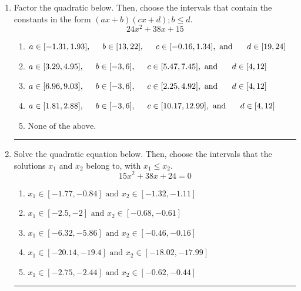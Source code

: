 \documentclass[14pt]{extbook}
\newcommand{\litem}[1]{\item#1\hspace*{-1cm}\rule{\textwidth}{0.4pt}}
\begin{document}
\begin{enumerate}
{\begin{enumerate}[label=\Alph*.]
\end{enumerate} }
\litem{
Factor the quadratic below. Then, choose the intervals that contain the constants in the form $(ax+b)(cx+d); b \leq d.$\[ 24x^{2} +38 x + 15 \]\begin{enumerate}[label=\Alph*.]
\item \( a \in [-1.31, 1.93], \hspace*{5mm} b \in [13, 22], \hspace*{5mm} c \in [-0.16, 1.34], \text{ and } \hspace*{5mm} d \in [19, 24] \)
\item \( a \in [3.29, 4.95], \hspace*{5mm} b \in [-3, 6], \hspace*{5mm} c \in [5.47, 7.45], \text{ and } \hspace*{5mm} d \in [4, 12] \)
\item \( a \in [6.96, 9.03], \hspace*{5mm} b \in [-3, 6], \hspace*{5mm} c \in [2.25, 4.92], \text{ and } \hspace*{5mm} d \in [4, 12] \)
\item \( a \in [1.81, 2.88], \hspace*{5mm} b \in [-3, 6], \hspace*{5mm} c \in [10.17, 12.99], \text{ and } \hspace*{5mm} d \in [4, 12] \)
\item \( \text{None of the above.} \)

\end{enumerate} }
\litem{
Solve the quadratic equation below. Then, choose the intervals that the solutions $x_1$ and $x_2$ belong to, with $x_1 \leq x_2$.\[ 15x^{2} +38 x + 24 = 0 \]\begin{enumerate}[label=\Alph*.]
\item \( x_1 \in [-1.77, -0.84] \text{ and } x_2 \in [-1.32, -1.11] \)
\item \( x_1 \in [-2.5, -2] \text{ and } x_2 \in [-0.68, -0.61] \)
\item \( x_1 \in [-6.32, -5.86] \text{ and } x_2 \in [-0.46, -0.16] \)
\item \( x_1 \in [-20.14, -19.4] \text{ and } x_2 \in [-18.02, -17.99] \)
\item \( x_1 \in [-2.75, -2.44] \text{ and } x_2 \in [-0.62, -0.44] \)


\end{enumerate}}
\end{enumerate}
\end{document}
